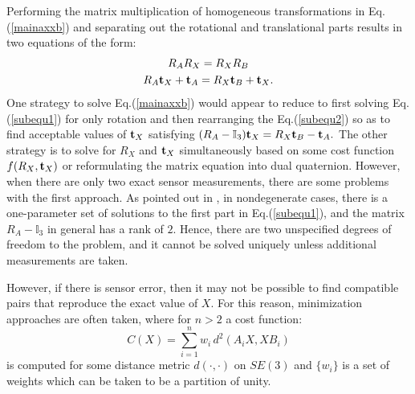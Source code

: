 \documentclass[twocolumn,10pt]{asme2ej}
\newcommand{\ttt}{{\bf t}}
\begin{document}
Performing the matrix multiplication of homogeneous transformations in Eq.(\ref{mainaxxb}) and separating out the rotational and translational parts results in two equations of the form:
\begin{subequations}
\begin{gather}
R_A R_X = R_X R_B \label{subequ1}\\
R_A {\bf t}_X + {\bf t}_A = R_X {\bf t}_B + {\bf t}_X \label{subequ2}.
\end{gather}
\label{axxb}
\end{subequations}
One strategy to solve Eq.(\ref{mainaxxb}) would appear to reduce to first solving Eq.(\ref{subequ1}) for only rotation and then rearranging the Eq.(\ref{subequ2}) so as to find acceptable values of ${\bf t}_X$ satisfying $ (R_A - \mathbb{I}_{3}) {\bf t}_X = R_X {\bf t}_B - {\bf t}_A. $  The other strategy is to solve for $R_{X}$ and $\ttt_{X}$ simultaneously based on some cost function $f(R_{X}, \ttt_{X})$ or reformulating the matrix equation into dual quaternion. However, when there are only two exact sensor measurements, there are some problems with the first  approach. As pointed out in \cite{park1994robot,shiu1989calibration}, in nondegenerate cases, there is a one-parameter set of solutions to the first part in Eq.(\ref{subequ1}), and the matrix $R_A - \mathbb{I}_{3}$ in general has a rank of $2$. Hence, there are two unspecified degrees of freedom to the
problem, and it cannot be solved uniquely unless additional measurements are taken. 

However, if there is sensor error, then it may not be possible to find compatible pairs that reproduce the exact value of $X$. For this reason, minimization approaches are often taken, where for $n>2$ a cost function:
\begin{equation}
C(X) = \sum_{i=1}^{n} w_i \, d^2(A_i X,X B_i)
\label{mainaxxb2}
\end{equation}
is computed for some distance metric $d(\cdot,\cdot)$ on $SE(3)$ and $\{w_i\}$ is a set of weights which can be taken to be a partition of unity. 
\end{document}
